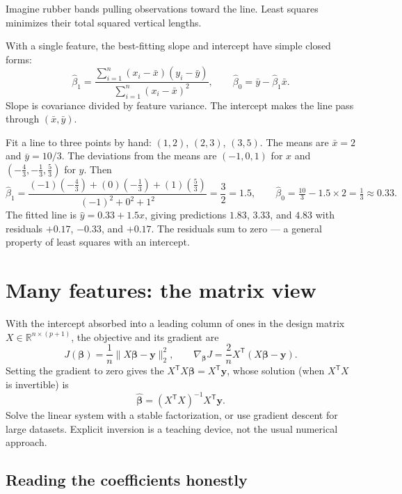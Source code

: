 \begin{intuition}
Imagine rubber bands pulling observations toward the line. Least squares minimizes their total squared vertical lengths.
\end{intuition}

With a single feature, the best-fitting slope and intercept have simple closed forms:
\[
  \hat{\beta}_1
  =\frac{\sum_{i=1}^{n}(x_i-\bar{x})(y_i-\bar{y})}
        {\sum_{i=1}^{n}{(x_i-\bar{x})}^2},
  \qquad
  \hat{\beta}_0=\bar{y}-\hat{\beta}_1\bar{x}.
\]
Slope is covariance divided by feature variance. The intercept makes the line pass through $(\bar x,\bar y)$.

\begin{workedexample}
Fit a line to three points by hand: $(1,2)$, $(2,3)$, $(3,5)$.
The means are $\bar{x}=2$ and $\bar{y}=10/3$. The deviations from the means are $(-1,0,1)$ for $x$ and $(-\tfrac{4}{3},-\tfrac{1}{3},\tfrac{5}{3})$ for $y$. Then
\[
  \hat{\beta}_1
  =\frac{(-1)(-\tfrac{4}{3})+(0)(-\tfrac{1}{3})+(1)(\tfrac{5}{3})}
        {{(-1)}^2+0^2+1^2}
  =\frac{3}{2}=1.5,
  \qquad
  \hat{\beta}_0=\tfrac{10}{3}-1.5\times 2=\tfrac{1}{3}\approx 0.33.
\]
The fitted line is $\hat{y}=0.33+1.5x$, giving predictions $1.83$, $3.33$, and $4.83$ with residuals $+0.17$, $-0.33$, and $+0.17$. The residuals sum to zero --- a general property of least squares with an intercept.
\end{workedexample}

\section{Many features: the matrix view}

With the intercept absorbed into a leading column of ones in the design matrix $X\in\mathbb{R}^{n\times(p+1)}$, the objective and its gradient are
\[
  J(\bm{\beta})=\frac{1}{n}\|X\bm{\beta}-\bm{y}\|_2^2,
  \qquad
  \nabla_{\bm{\beta}}J
  =\frac{2}{n}X^{\mathsf T}(X\bm{\beta}-\bm{y}).
\]
Setting the gradient to zero gives the  $X^{\mathsf T}X\bm{\beta}=X^{\mathsf T}\bm{y}$, whose solution (when $X^{\mathsf T}X$ is invertible) is
\[
  \hat{\bm{\beta}}={(X^{\mathsf T}X)}^{-1}X^{\mathsf T}\bm{y}.
\]
Solve the linear system with a stable factorization, or use gradient descent for large datasets. Explicit inversion is a teaching device, not the usual numerical approach.

\subsection{Reading the coefficients honestly}

